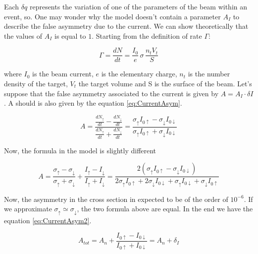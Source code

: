 Each $\delta q$ represents the variation of one of the parameters of the beam within an event, so.
One may wonder why the model doesn't contain a parameter $A_{I}$ to describe the false asymmetry due to the current. We can show theoretically that the values of $A_{I}$ is equal to $1$. Starting from the definition of rate $\Gamma$:

\begin{equation}
\Gamma = \frac{dN}{dt} = \frac{I_{0}}{e} \, \sigma \, \frac{n_{t} V_t}{S}
\end{equation}

where $I_{0}$ is the beam current, $e$ is the elementary charge, $n_{t}$ is the number density of the target, $V_{t}$ the target volume and S is the surface of the beam. Let's suppose that the false asymmetry associated to the current is given by $A = A_{I} \cdot \delta I$. A should is also given by the equation \ref{eq:CurrentAsym}.

\begin{equation} \label{eq:CurrentAsym}
A = \dfrac{\frac{dN_{\uparrow}}{dt} - \frac{dN_{\downarrow}}{dt}}{\frac{dN_{\uparrow}}{dt} + \frac{dN_{\downarrow}}{dt}} = \dfrac{\sigma_{\uparrow} I_{0 \uparrow} - \sigma_{\downarrow} I_{0 \downarrow}}{\sigma_{\uparrow} I_{0 \uparrow} + \sigma_{\downarrow} I_{0 \downarrow}}
\end{equation}

Now, the formula in the model is slightly different

\begin{equation}
A = \dfrac{\sigma_{\uparrow} - \sigma_{\downarrow}}{\sigma_{\uparrow} + \sigma_{\downarrow}} + \dfrac{I_{\uparrow} - I_{\downarrow}}{I_{\uparrow} + I_{\downarrow}} = \dfrac{2(\sigma_{\uparrow} I_{0 \uparrow} - \sigma_{\downarrow} I_{0 \downarrow})}{ 2\sigma_{\uparrow} I_{0 \uparrow} + 2\sigma_{\downarrow} I_{0 \downarrow} + \sigma_{\uparrow} I_{0 \downarrow} + \sigma_{\downarrow} I_{0 \uparrow}  }
\end{equation}

Now, the asymmetry in the cross section in expected to be of the order of $10^{-6}$. 
If we approximate $\sigma_{\uparrow} \simeq \sigma_{\downarrow}$, the two formula above are equal. In the end we have the equation \ref{eq:CurrentAsym2}.

\begin{equation} \label{eq:CurrentAsym2}
A_{tot} = A_{n} + \dfrac{I_{0 \uparrow} - I_{0 \downarrow}}{I_{0 \uparrow} + I_{0 \downarrow}} = A_{n} + \delta_{I}
\end{equation}

